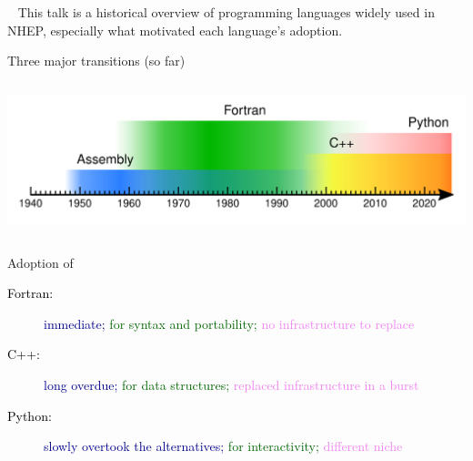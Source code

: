 \documentclass[aspectratio=169]{beamer}
\begin{document}
\begin{frame}{\mbox{ }}
\large
\vspace{0.5 cm}
This talk is a historical overview of programming languages widely used in NHEP, especially what motivated each language's adoption.

\vspace{1 cm}

\vspace{1 cm}

\vspace{0.2 cm}
\end{frame}

\begin{frame}{Three major transitions (so far)}
\begin{columns}
\includegraphics[width=\linewidth]{PLOTS/programming-languages.pdf}
\end{columns}

\large
\vspace{0.5 cm}
Adoption of

\begin{description}
\item[\textcolor{black}{Fortran:}] \textcolor{darkblue}{immediate;} \textcolor{darkgreen}{for syntax and portability;} \textcolor{violet}{no infrastructure to replace}
\item[\textcolor{black}{C++:}] \textcolor{darkblue}{long overdue;} \textcolor{darkgreen}{for data structures;} \textcolor{violet}{replaced infrastructure in a burst}
\item[\textcolor{black}{Python:}] \textcolor{darkblue}{slowly overtook the alternatives;} \textcolor{darkgreen}{for interactivity;} \textcolor{violet}{different niche}
\end{description}
\end{frame}
\end{document}
